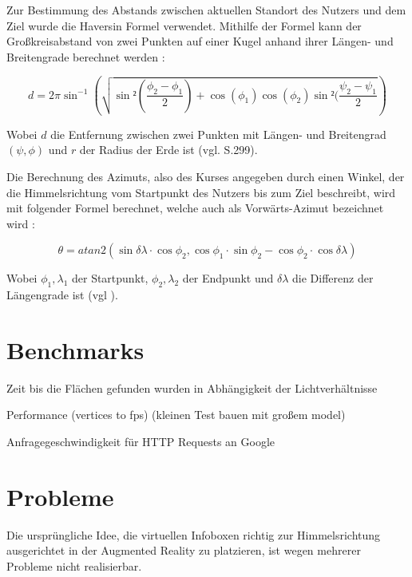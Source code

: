 Zur Bestimmung des Abstands zwischen aktuellen Standort des Nutzers und dem Ziel wurde die Haversin Formel verwendet. Mithilfe der Formel kann der Großkreisabstand von zwei Punkten auf einer Kugel anhand ihrer Längen- und Breitengrade berechnet werden \cite{haversine}: 

\begin{equation}
d = 2 \pi \sin^{-1} (\sqrt{\sin²(\frac{\phi_2 - \phi_1}{2})+\cos(\phi_1)\cos(\phi_2)\sin²(\frac{\psi_2-\psi_1}{2}})
\end{equation}

Wobei $d$ die Entfernung zwischen zwei Punkten mit Längen- und Breitengrad $(\psi,\phi)$ und $r$ der Radius der Erde ist (vgl. \cite{haversine} S.299).

Die Berechnung des Azimuts, also des Kurses angegeben durch einen Winkel, der die Himmelsrichtung vom Startpunkt des Nutzers bis zum Ziel beschreibt, wird mit folgender Formel berechnet, welche auch als \glqq Vorwärts-Azimut\grqq{} bezeichnet wird \cite{bearing}:

\begin{equation}
\theta = atan2(\sin \delta\lambda \cdot\cos\phi_2, \cos \phi_1 \cdot\sin\phi_2 - \cos\phi_2 \cdot\cos\delta\lambda)
\end{equation}

Wobei $\phi_1,\lambda_1$ der Startpunkt, $\phi_2,\lambda_2$ der Endpunkt und $\delta\lambda$   die Differenz der Längengrade ist (vgl \cite{bearing}).

\section{Benchmarks}

Zeit bis die Flächen gefunden wurden in Abhängigkeit der Lichtverhältnisse

Performance (vertices to fps) (kleinen Test bauen mit großem model)

Anfragegeschwindigkeit für HTTP Requests an Google

\section{Probleme}

Die ursprüngliche Idee, die virtuellen Infoboxen richtig zur Himmelsrichtung ausgerichtet in der Augmented Reality zu platzieren, ist wegen mehrerer Probleme nicht realisierbar.

